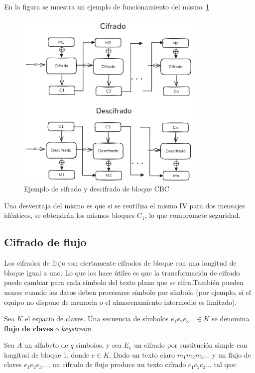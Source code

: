 En la figura se muestra un ejemplo de funcionamiento del mismo~\ref{fig:CBC_block_cypher}
\begin{figure}[H]
    \centering
    \includegraphics[width=0.8\textwidth]{imagenes/CBC_block_cypher.png}
    \caption{Ejemplo de cifrado y descifrado de bloque CBC}
    \label{fig:CBC_block_cypher}
\end{figure}

Una desventaja del mismo es que si se reutiliza el mismo IV para dos mensajes idénticos, se obtendrán los mismos bloques $C_1$, lo que compromete seguridad\cite{Block_Cipher}.

\subsection{Cifrado de flujo}
Los cifrados de flujo son ciertamente cifrados de bloque con una longitud de bloque igual a uno. Lo que los hace útiles es que la transformación de cifrado puede cambiar para cada símbolo del texto plano que se cifra.También pueden usarse cuando los datos deben procesarse símbolo por símbolo (por ejemplo, si el equipo no dispone de memoria o el almacenamiento intermedio es limitado).

Sea $K$ el espacio de claves. Una secuencia de símbolos $e_1e_2e_3\ldots \in K$ se denomina \textbf{flujo de claves} o \textit{keystream}.

Sea $A$ un alfabeto de $q$ símbolos, y sea $E_e$ un cifrado por sustitución simple con longitud de bloque 1, donde $e \in K$. Dado un texto claro $m_1m_2m_3\ldots$ y un flujo de claves $e_1e_2e_3\ldots$, un cifrado de flujo produce un texto cifrado $c_1c_2c_3\ldots$ tal que:

